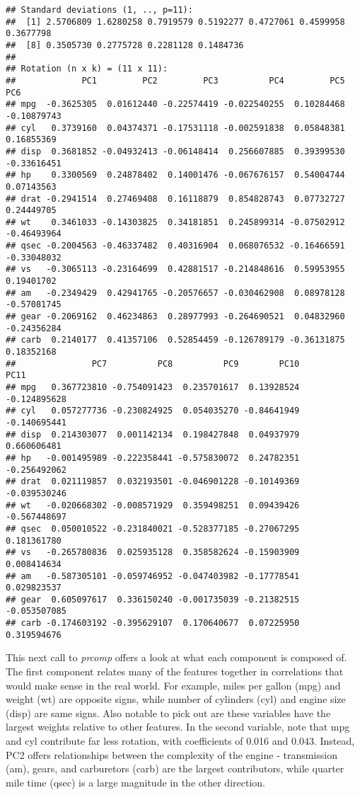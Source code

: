 \documentclass[
]{article}
\begin{document}
\begin{verbatim}
## Standard deviations (1, .., p=11):
##  [1] 2.5706809 1.6280258 0.7919579 0.5192277 0.4727061 0.4599958 0.3677798
##  [8] 0.3505730 0.2775728 0.2281128 0.1484736
## 
## Rotation (n x k) = (11 x 11):
##             PC1         PC2         PC3          PC4         PC5         PC6
## mpg  -0.3625305  0.01612440 -0.22574419 -0.022540255  0.10284468 -0.10879743
## cyl   0.3739160  0.04374371 -0.17531118 -0.002591838  0.05848381  0.16855369
## disp  0.3681852 -0.04932413 -0.06148414  0.256607885  0.39399530 -0.33616451
## hp    0.3300569  0.24878402  0.14001476 -0.067676157  0.54004744  0.07143563
## drat -0.2941514  0.27469408  0.16118879  0.854828743  0.07732727  0.24449705
## wt    0.3461033 -0.14303825  0.34181851  0.245899314 -0.07502912 -0.46493964
## qsec -0.2004563 -0.46337482  0.40316904  0.068076532 -0.16466591 -0.33048032
## vs   -0.3065113 -0.23164699  0.42881517 -0.214848616  0.59953955  0.19401702
## am   -0.2349429  0.42941765 -0.20576657 -0.030462908  0.08978128 -0.57081745
## gear -0.2069162  0.46234863  0.28977993 -0.264690521  0.04832960 -0.24356284
## carb  0.2140177  0.41357106  0.52854459 -0.126789179 -0.36131875  0.18352168
##               PC7          PC8          PC9        PC10         PC11
## mpg   0.367723810 -0.754091423  0.235701617  0.13928524 -0.124895628
## cyl   0.057277736 -0.230824925  0.054035270 -0.84641949 -0.140695441
## disp  0.214303077  0.001142134  0.198427848  0.04937979  0.660606481
## hp   -0.001495989 -0.222358441 -0.575830072  0.24782351 -0.256492062
## drat  0.021119857  0.032193501 -0.046901228 -0.10149369 -0.039530246
## wt   -0.020668302 -0.008571929  0.359498251  0.09439426 -0.567448697
## qsec  0.050010522 -0.231840021 -0.528377185 -0.27067295  0.181361780
## vs   -0.265780836  0.025935128  0.358582624 -0.15903909  0.008414634
## am   -0.587305101 -0.059746952 -0.047403982 -0.17778541  0.029823537
## gear  0.605097617  0.336150240 -0.001735039 -0.21382515 -0.053507085
## carb -0.174603192 -0.395629107  0.170640677  0.07225950  0.319594676
\end{verbatim}

This next call to \emph{prcomp} offers a look at what each component is
composed of. The first component relates many of the features together
in correlations that would make sense in the real world. For example,
miles per gallon (mpg) and weight (wt) are opposite signs, while number
of cylinders (cyl) and engine size (disp) are same signs. Also notable
to pick out are these variables have the largest weights relative to
other features. In the second variable, note that mpg and cyl contribute
far less rotation, with coefficients of 0.016 and 0.043. Instead, PC2
offers relationships between the complexity of the engine - transmission
(am), gears, and carburetors (carb) are the largest contributors, while
quarter mile time (qsec) is a large magnitude in the other direction.
\end{document}
